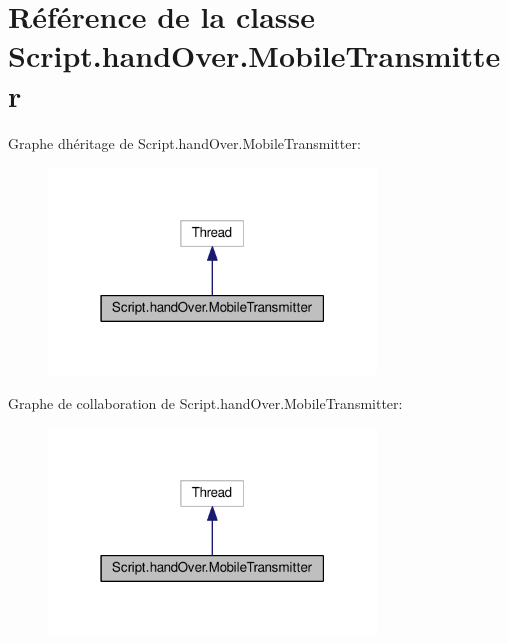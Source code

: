 \hypertarget{classScript_1_1handOver_1_1MobileTransmitter}{}\section{Référence de la classe Script.\+hand\+Over.\+Mobile\+Transmitter}
\label{classScript_1_1handOver_1_1MobileTransmitter}


Graphe d\textquotesingle{}héritage de Script.\+hand\+Over.\+Mobile\+Transmitter\+:\nopagebreak
\begin{figure}[H]
\begin{center}
\leavevmode
\includegraphics[width=247pt]{classScript_1_1handOver_1_1MobileTransmitter__inherit__graph}
\end{center}
\end{figure}


Graphe de collaboration de Script.\+hand\+Over.\+Mobile\+Transmitter\+:\nopagebreak
\begin{figure}[H]
\begin{center}
\leavevmode
\includegraphics[width=247pt]{classScript_1_1handOver_1_1MobileTransmitter__coll__graph}
\end{center}
\end{figure}
